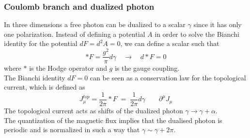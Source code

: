 \subsubsection{Coulomb branch and dualized photon	}
In three dimensions a free photon can be dualized to a scalar $\gamma$ since it has only one polarization.
Instead of defining a potential $A$ in order to solve the Bianchi identity for the potential $d F = d^2 A = 0$, we can define a scalar such that
\begin{equation}
  * F = \frac{g^2}{\pi} d  \gamma  \quad \rightarrow \quad d * F  = 0  
\end{equation} 
where $*$ is the Hodge operator and $g$ is the gauge coupling.\\
The Bianchi identity $d F = 0$ can be seen as a conservation law for the topological current, which is defined as
\begin{equation}
 J_{\mu}^{top} = \frac{1}{2 \pi} * F \; =  \; \frac{1}{2 \pi} d \gamma \qquad \partial^{\mu} J_{\mu} 
\end{equation}
The topological current acts as shifts of the dualized photon $\gamma \rightarrow \gamma + \alpha$.\\
The quantization of the magnetic flux implies that the dualised photon is periodic and is normalized in such a way that $\gamma \sim \gamma + 2 \pi$.


